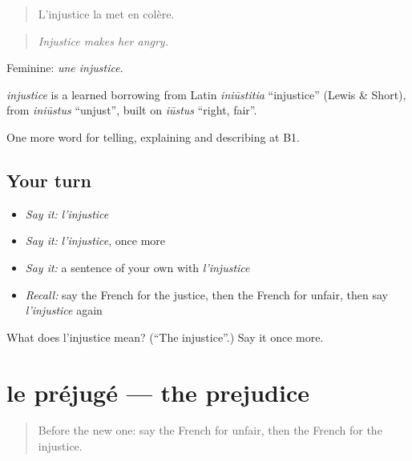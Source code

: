 \begin{quote}
L'injustice la met en colère.
\end{quote}

\begin{quote}
\emph{Injustice makes her angry.}
\end{quote}

Feminine: \emph{une injustice}.

\begin{cousinweb}
\emph{injustice} is a learned borrowing from Latin \emph{iniūstitia} \textquotedblleft{}injustice\textquotedblright{} (Lewis \& Short), from \emph{iniūstus} \textquotedblleft{}unjust\textquotedblright{}, built on \emph{iūstus} \textquotedblleft{}right, fair\textquotedblright{}.
\end{cousinweb}

\begin{grammarlens}[title={What you've built}]
One more word for telling, explaining and describing at B1.
\end{grammarlens}

\subsection*{Your turn}
\begin{itemize}
\raggedright
  \item \emph{Say it:} \emph{l'injustice}
  \item \emph{Say it:} \emph{l'injustice}, once more
  \item \emph{Say it:} a sentence of your own with \emph{l'injustice}
  \item \emph{Recall:} say the French for the justice, then the French for unfair, then say \emph{l'injustice} again
\end{itemize}

\begin{tcolorbox}[breakable,colback=teal!4,colframe=teal!35!black,title={Before you move on}]
What does l'injustice mean? (\textquotedblleft{}The injustice\textquotedblright{}.) Say it once more.
\end{tcolorbox}
\section[le préjugé]{le préjugé — the prejudice}

\label{lesson:FR-C364-prejuge}



\begin{quote}
Before the new one: say the French for unfair, then the French for the injustice.
\end{quote}

